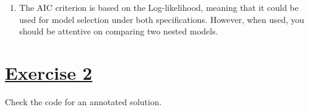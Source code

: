 \documentclass[a4paper,12pt]{article}\usepackage[]{graphicx}\usepackage[]{color}
\def\by{\mathbf{y}}
\def\bx{\mathbf{x}}
\def\bbeta{\mbox{\boldmath $\beta$}}
\def\bY{\mathbf{Y}}
\def\op{\left(}
\def\cp{\right)}
\begin{document}
\begin{enumerate}
{\begin{align}
\mathcal{D}^{*}\op \by, \widehat{\mathbf{p}}\cp
&=
- 2 \sum_{i=1}^{2074} y_i \log{\widehat{p}_i} + \op 1-y_i\cp  \log  \op 1-\widehat{p}_i \cp \nonumber\\
&= - 2 \sum_{i=1}^{2074} y_i \log \frac{\widehat{p}_i}{1-\widehat{p}_i} +   \log \op 1-\widehat{p}_i \cp \nonumber\\
&= - 2 \sum_{i=1}^{2074} y_i \bx_i^T\widehat{\bbeta} +   \log \op 1-\widehat{p}_i \cp \nonumber \\
\mathcal{D}^{*}\op \by, \widehat{\mathbf{p}}\cp 
&= - 2 \sum_{i=1}^{2074} \widehat{p}_i \bx_i^T\widehat{\bbeta} +  \log \op 1-\widehat{p}_i \cp  \ \mathrm{since :} \sum_{i=1}^{2074} \op y_i - \widehat{p}_i \cp \bx_i = 0 
\end{align}

From the last expression, it is apparent that, given the values of $\widehat{\bbeta}$, the deviance doesn't depend on $y_i$, making it a bad GOF measure. Consequently, it holds that the distribution of this statistic conditional on values of $\widehat{\bbeta}$ is degenerate, meaning that the approximation via the $\chi^2$ is not possible.  

In the binomial specification, this doesn't hold any more, given that $Y_i$ can have different possible values, meaning that their contributions to the residual deviance are not neglected.   

{\color{red}
\begin{equation}
\mathcal{D}^{*}\op \bY, \widehat{\mathbf{p}} \cp 
= 
2 \sum_{i=1}^6 Y_i \log \left( \frac{Y_i}{m_i \widehat{p}_i} \right) + \op m_i-Y_i\cp  \log \left( \frac{m_i- Y_i}{m_i(1-\widehat{p}_i)} \right)
\end{equation}
}
In that case, the statistic is a good GOF measure and its distribution can be approximated with the $\chi^2$. However, as in any case, the distribution of the deviance depends also on the number of available observations! Moral of the story : be careful when using the deviance in a binomial model.  
}

\item {\color{blue} The AIC criterion is based on the Log-likelihood, meaning that it could be used for model selection under both specifications. However, when used, you should be attentive on comparing two nested models.}

\end{enumerate}

\section{\underline{Exercise 2}}

{\color{blue}  Check the code for an annotated solution.}
\end{document}
